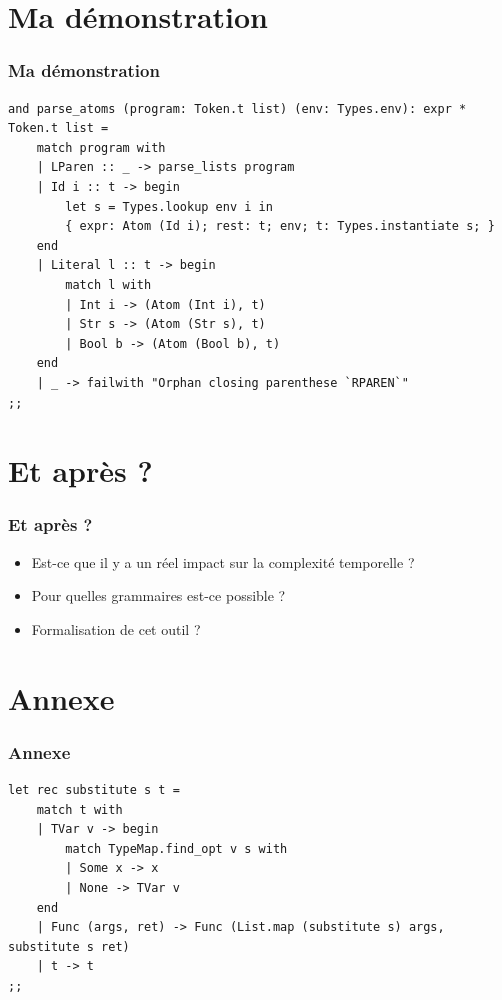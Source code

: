\documentclass{beamer}
\begin{document}
\section{Ma démonstration}
\begin{frame}[fragile]
		\frametitle{Ma démonstration}
		\begin{lstlisting}[language=Ml]
and parse_atoms (program: Token.t list) (env: Types.env): expr * Token.t list = 
    match program with
    | LParen :: _ -> parse_lists program
    | Id i :: t -> begin
        let s = Types.lookup env i in
        { expr: Atom (Id i); rest: t; env; t: Types.instantiate s; }
    end
    | Literal l :: t -> begin
        match l with
        | Int i -> (Atom (Int i), t)
        | Str s -> (Atom (Str s), t)
        | Bool b -> (Atom (Bool b), t)
    end
    | _ -> failwith "Orphan closing parenthese `RPAREN`"
;;
		\end{lstlisting}
\end{frame}

\section{Et après ?}
\begin{frame}
		\frametitle{Et après ?}
		\begin{itemize}
				\item<1-> Est-ce que il y a un réel impact sur la complexité temporelle ?
				\item<2->Pour quelles grammaires est-ce possible ?
				\item<3->Formalisation de cet outil ?
		\end{itemize}
\end{frame}

\section{Annexe}
\begin{frame}[fragile]
		\frametitle{Annexe}
		\begin{lstlisting}[language=Ml]
let rec substitute s t =
    match t with
    | TVar v -> begin 
        match TypeMap.find_opt v s with
        | Some x -> x
        | None -> TVar v
    end
    | Func (args, ret) -> Func (List.map (substitute s) args, substitute s ret)
    | t -> t
;;

		\end{lstlisting}
\end{frame}
\end{document}
